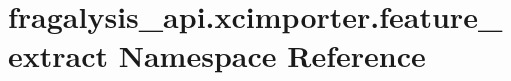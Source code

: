 \hypertarget{namespacefragalysis__api_1_1xcimporter_1_1feature__extract}{}\section{fragalysis\+\_\+api.\+xcimporter.\+feature\+\_\+extract Namespace Reference}
\label{namespacefragalysis__api_1_1xcimporter_1_1feature__extract}

